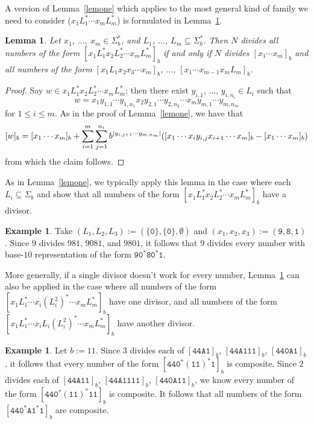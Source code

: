 \documentclass[12pt]{article}
\DeclarePairedDelimiter\abs{\lvert}{\rvert}
\theoremstyle{plain}
\newtheorem{lemma}[theorem]{Lemma}
\theoremstyle{definition}
\newtheorem{example}[theorem]{Example}
\theoremstyle{remark}
\newcommand{\0}{\mathtt{0}}
\newcommand{\1}{\mathtt{1}}
\newcommand{\2}{\mathtt{2}}
\newcommand{\3}{\mathtt{3}}
\newcommand{\4}{\mathtt{4}}
\newcommand{\5}{\mathtt{5}}
\newcommand{\6}{\mathtt{6}}
\newcommand{\7}{\mathtt{7}}
\newcommand{\8}{\mathtt{8}}
\newcommand{\9}{\mathtt{9}}
\newcommand{\A}{\mathtt{A}}
\begin{document}
A version of Lemma~\ref{lemone} which applies to the most general kind 
of family we need to consider ($x_1L_1^*\dotsm x_mL_m^*$)
is formulated in Lemma~\ref{lemtwo}.

\begin{lemma}\label{lemtwo}
Let $x_1$, $\dotsc$, $x_m\in \Sigma^*_b$, and $L_1$, $\dotsc$, 
$L_m\subseteq\Sigma^*_b$.  Then
$N$ divides all numbers of the form $[x_1L_1^*x_2L_2^*\dotsm x_mL_m^*]_b$
if and only if
$N$ divides $[x_1\dotsm x_m]_b$ and all numbers of the form 
$[x_1L_1x_2x_3\dotsm x_m]_b$, $\dotsc$, $[x_1\dotsm x_{m-1}x_mL_m]_b$.
\end{lemma}
\begin{proof}
Say $w\in x_1L_1^*x_2L_2^*\dotsm x_mL_m^*$; then there exist
$y_{i,1}$, $\dotsc$, $y_{i,n_i}\in L_i$ such that
\[ w = x_1y_{1,1}\dotsm y_{1,n_1}x_2y_{2,1}\dotsm y_{2,n_2}\dotsm x_m y_{m,1}\dotsm y_{m,n_m} \]
for $1\leq i\leq m$.
As in the proof of Lemma~\ref{lemone}, we have that
\[ [w]_b = [x_1\dotsm x_m]_b + \sum_{i=1}^m\sum_{j=1}^{n_i} b^{\abs{y_{i,j+1}\dotsm y_{m,n_m}}}([x_1\dotsm x_i y_{i,j} x_{i+1}\dotsm x_m]_b-[x_1\dotsm x_m]_b) \]
from which the claim follows.
\end{proof}
As in Lemma~\ref{lemone}, we typically apply this lemma in the case 
where each $L_i\subseteq\Sigma_b$ and show that all numbers of the 
form $[x_1L_1^*x_2L_2^*\dotsm x_mL_m^*]_b$ have a divisor.
\begin{example}
Take $(L_1, L_2, L_3) := (\{ \0 \},\{\0\},\emptyset)$ and $(x_1,x_2, x_3) := (\9, \8, \1)$.
Since $9$ divides $981$, $9081$, and $9801$, it follows that $9$ 
divides every number with base-$10$ representation
of the form $\9\0^*\8\0^*\1$.
\end{example}

More generally, if a single divisor doesn't work for every number, 
Lemma~\ref{lemtwo} can also be applied in the case where all numbers 
of the form $[x_1L_1^*\dotsm x_i(L_i^2)^*\dotsm x_mL_m^*]_b$ have one
divisor, and all numbers of the form 
$[x_1L_1^*\dotsm x_iL_i(L_i^2)^*\dotsm x_mL_m^*]_b$ have another divisor.
\begin{example}
Let $b := 11$.
Since $3$ divides each of $[\4\4\A\1]_b$,
$[\4\4\A\1\1\1]_b$,
$[\4\4\0\A\1]_b$ ,
it follows that
every number of the form $[\4\4\0^*(\1\1)^*\1]_b$ is composite.
Since $2$ divides each of $[\4\4\A\1\1]_b$,
$[\4\4\A\1\1\1\1]_b$, $[\4\4\0\A\1\1]_b$, we know
every number of the form $[\4\4\0^*(\1\1)^*\1\1]_b$ is composite.
It follows that all numbers of the form $[\4\4\0^*\A\1^*\1]_b$ are composite.
\end{example}
\end{document}
